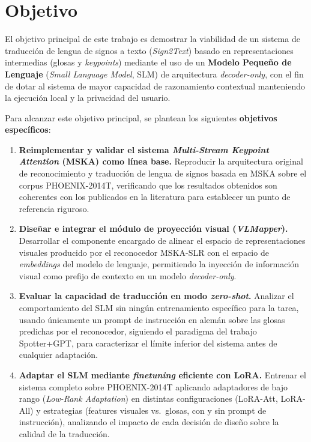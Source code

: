 \section{Objetivo}
El objetivo principal de este trabajo es demostrar la viabilidad de un sistema de traducción de lengua de signos a texto (\textit{Sign2Text}) basado en representaciones intermedias (glosas y \textit{keypoints}) mediante el uso de un \textbf{Modelo Pequeño de Lenguaje} (\textit{Small Language Model}, SLM) de arquitectura \textit{decoder-only}, con el fin de dotar al sistema de mayor capacidad de razonamiento contextual manteniendo la ejecución local y la privacidad del usuario.

Para alcanzar este objetivo principal, se plantean los siguientes \textbf{objetivos específicos}:

\begin{enumerate}

    \item \textbf{Reimplementar y validar el sistema \textit{Multi-Stream Keypoint Attention} (MSKA) como línea base.}
    Reproducir la arquitectura original de reconocimiento y traducción de lengua de signos basada en MSKA sobre el corpus PHOENIX-2014T, verificando que los resultados obtenidos son coherentes con los publicados en la literatura para establecer un punto de referencia riguroso.

    \item \textbf{Diseñar e integrar el módulo de proyección visual (\textit{VLMapper}).}
    Desarrollar el componente encargado de alinear el espacio de representaciones visuales producido por el reconocedor MSKA-SLR con el espacio de \textit{embeddings} del modelo de lenguaje, permitiendo la inyección de información visual como prefijo de contexto en un modelo \textit{decoder-only}.

    \item \textbf{Evaluar la capacidad de traducción en modo \textit{zero-shot}.}
    Analizar el comportamiento del SLM sin ningún entrenamiento específico para la tarea, usando únicamente un prompt de instrucción en alemán sobre las glosas predichas por el reconocedor, siguiendo el paradigma del trabajo Spotter+GPT, para caracterizar el límite inferior del sistema antes de cualquier adaptación.

    \item \textbf{Adaptar el SLM mediante \textit{finetuning} eficiente con LoRA.}
    Entrenar el sistema completo sobre PHOENIX-2014T aplicando adaptadores de bajo rango (\textit{Low-Rank Adaptation}) en distintas configuraciones (LoRA-Att, LoRA-All) y estrategias (features visuales vs.\ glosas, con y sin prompt de instrucción), analizando el impacto de cada decisión de diseño sobre la calidad de la traducción.


\end{enumerate}
